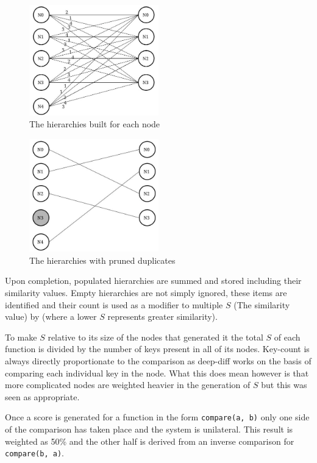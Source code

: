 \documentclass[jou,apacite]{apa6}
\begin{document}
\begin{figure}[h]
\caption{The hierarchies built for each node}
\centering
\includegraphics[width=0.50\textwidth]{allhierarchies}
\end{figure}



\begin{figure}[h]
\caption{The hierarchies with pruned duplicates}
\centering
\includegraphics[width=0.50\textwidth]{hierarchies}
\end{figure}

Upon completion, populated hierarchies are summed and stored including their similarity values. Empty hierarchies are not simply ignored, these items are identified and their count is used as a modifier to multiple $S$ (The similarity value) by (where a lower $S$ represents greater similarity).  

To make $S$ relative to its size of the nodes that generated it the total $S$ of each function is divided by the number of keys present in all of its nodes. Key-count is always directly proportionate to the comparison as deep-diff works on the basis of comparing each individual key in the node. What this does mean however is that more complicated nodes are weighted heavier in the generation of $S$ but this was seen as appropriate.

Once a score is generated for a function in the form \texttt{compare(a, b)} only one side of the comparison has taken place and the system is unilateral. This result is weighted as 50\% and the other half is derived from an inverse comparison for \texttt{compare(b, a)}.
\end{document}
